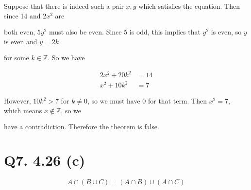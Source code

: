 \documentclass{article}
\begin{document}
Suppose that there is indeed such a pair $x, y$ which satisfies the equation. Then since 14 and $2x^2$ are 

both even, $5y^2$ must also be even. Since 5 is odd, this implies that $y^2$ is even, so $y$ is even and $y = 2k$ 

for some $k \in \mathbb{Z}$. So we have

\begin{align*}
  2x^2 + 20k^2 &= 14 \\
  x^2 + 10k^2 &= 7
\end{align*}

However, $10k^2 > 7$ for $k \neq 0$, so we must have 0 for that term. Then $x^2 = 7$, which means $x \notin \mathbb{Z}$, so we 

have a contradiction. Therefore the theorem is false. 

\section*{Q7. 4.26 (c)}

\def \setA{ (0,0) circle (.75cm) }
\def \setB{ (60:.75) circle (.75cm) }
\def \setC{ (.75,0) circle (.75cm) }



  $$A \cap (B \cup C) = (A \cap B) \cup (A \cap C)$$
\end{document}
